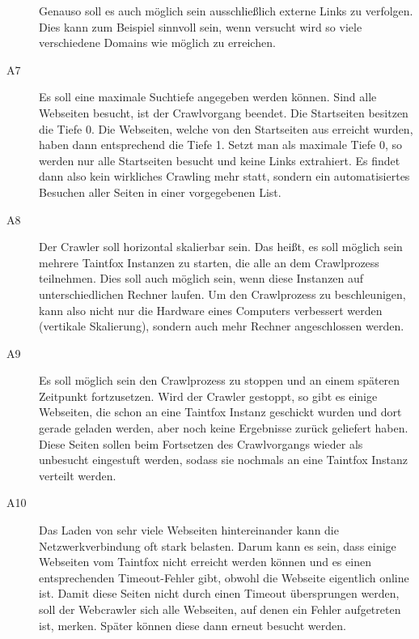 \begin{description}
	Genauso soll es auch möglich sein ausschließlich externe Links zu verfolgen. Dies kann zum Beispiel sinnvoll sein, wenn versucht wird so viele verschiedene Domains wie möglich zu erreichen.
	\item[ A7 ] Es soll eine maximale Suchtiefe angegeben werden können. Sind alle Webseiten besucht, ist der Crawlvorgang beendet. Die Startseiten besitzen die Tiefe 0. Die Webseiten, welche von den Startseiten aus erreicht wurden, haben dann entsprechend die Tiefe 1. Setzt man als maximale Tiefe 0, so werden nur alle Startseiten besucht und keine Links extrahiert. Es findet dann also kein wirkliches Crawling mehr statt, sondern ein automatisiertes Besuchen aller Seiten in einer vorgegebenen List.
	\item[ A8 ] Der Crawler soll horizontal skalierbar sein. Das heißt, es soll möglich sein mehrere Taintfox Instanzen zu starten, die alle an dem Crawlprozess teilnehmen. Dies soll auch möglich sein, wenn diese Instanzen auf unterschiedlichen Rechner laufen. Um den Crawlprozess zu beschleunigen, kann also nicht nur die Hardware eines Computers verbessert werden (vertikale Skalierung), sondern auch mehr Rechner angeschlossen werden.
	\item[ A9 ]Es soll möglich sein den Crawlprozess zu stoppen und an einem späteren Zeitpunkt fortzusetzen. Wird der Crawler gestoppt, so gibt es einige Webseiten, die schon an eine Taintfox Instanz geschickt wurden und dort gerade geladen werden, aber noch keine Ergebnisse zurück geliefert haben. Diese Seiten sollen beim Fortsetzen des Crawlvorgangs wieder als unbesucht eingestuft werden, sodass sie nochmals an eine Taintfox Instanz verteilt werden.
	\item[A10] Das Laden von sehr viele Webseiten hintereinander kann die Netzwerkverbindung oft stark belasten. Darum kann es sein, dass einige Webseiten vom Taintfox nicht erreicht werden können und es einen entsprechenden Timeout-Fehler gibt, obwohl die Webseite eigentlich online ist. Damit diese Seiten nicht durch einen Timeout übersprungen werden, soll der Webcrawler sich alle Webseiten, auf denen ein Fehler aufgetreten ist, merken. Später können diese dann erneut besucht werden.  
\end{description}


